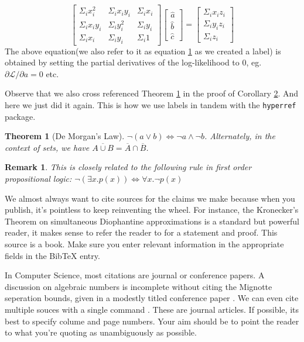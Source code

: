 \documentclass[a4paper]{article}
\newtheorem{theorem}{Theorem}
\newtheorem*{remark}{Remark}
\newcounter{num}[section]
\begin{document}
\begin{equation}
\label{equation1}
\left[
\begin{matrix}
\Sigma_{i}{}x_i^{2} & \Sigma_{i}{}x_iy_i & \Sigma_{i}{}x_i\\
\Sigma_{i}{}x_iy_i & \Sigma_{i}{}y_i^{2} & \Sigma_{i}{}y_i\\
\Sigma_{i}{}x_i & \Sigma_{i}{}y_i & \Sigma_{i}{}1
\end{matrix}
\right]
\left[
\begin{matrix}
\hat{a}\\
\hat{b}\\
\hat{c}
\end{matrix}
\right]
=
\left[
\begin{matrix}
\Sigma_{i}{}x_iz_i\\
\Sigma_{i}{}y_iz_i\\
\Sigma_{i}{}z_i
\end{matrix}
\right]
\end{equation}
The above equation(we also refer to it as equation \hyperref[equation1]{1} as we created a label) is obtained by setting the partial derivatives of the log-likelihood to 0, eg. $\partial \mathcal{L}/\partial a = 0$  etc.\par
Observe that we also cross referenced Theorem \hyperref[theorem1]{1} in the proof of Corollary \hyperref[corollary2]{2}. And here we just did it again. This is how we use labels in tandem with the \texttt{hyperref} package.\par
\begin{theorem}[De Morgan's Law]
\label{theorem3}
$\neg(a\lor b) \iff \neg a \land \neg b$. Alternately, in the context of sets, we have $\overline{A \cup B}= \overline{A}\cap \overline{B}$.
\end{theorem}
\begin{remark}
This is closely related to the following rule in first order propositional logic: $\neg(\exists x.p(x)) \iff \forall x.\neg p(x)$
\end{remark}
We almost always want to cite sources for the claims we make because when you publish, it's pointless to keep reinventing the wheel. For instance, the Kronecker's Theorem on simultaneous Diophantine approximations is a standard but powerful reader, it makes sense to refer the reader to \cite[,Chap.7, Sec. 1.3, Prop. 7]{ref2} for a statement and proof. This source is a book. Make sure you enter relevant information in the appropriate fields in the BibTeX entry.\par
In Computer Science, most citations are journal or conference papers. A discussion on algebraic numbers is incomplete without citing the Mignotte seperation bounds, given in a modestly titled conference paper \cite{ref3}. We can even cite multiple souces with a single command \cite{ref1,ref4}. These are journal articles. If possible, its best to specify colume and page numbers. Your aim should be to point the reader to what you're quoting as unambiguously as possible.\par
\end{document}

